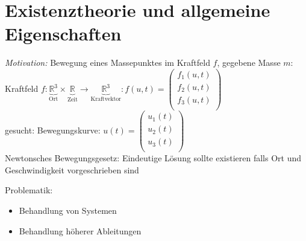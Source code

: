 \section{Existenztheorie und allgemeine Eigenschaften}
\emph{Motivation:}
Bewegung eines Massepunktes im Kraftfeld $f$,
gegebene Masse $m$:
Kraftfeld 
$f: \underbrace{\mathbb{R}^3}_{\text{Ort} }
\times \underbrace{\mathbb{R}}_{\text{Zeit} }
\rightarrow \underbrace{\mathbb{R}^3}_{\text{Kraftvektor}}:
f(u,t) = 
\begin{pmatrix}
    f_1(u,t) \\
    f_2(u,t) \\
    f_3(u,t) \\
\end{pmatrix}
$ \\
gesucht:
Bewegungskurve:
$u(t) = 
\begin{pmatrix}
    u_1(t) \\
    u_2(t) \\
    u_3(t) \\
\end{pmatrix}
$\\
Newtonsches Bewegungsgesetz:
Eindeutige Lösung sollte existieren falls Ort und Geschwindigkeit vorgeschrieben sind

Problematik:
\begin{itemize}
    \item Behandlung von Systemen
    \item Behandlung höherer Ableitungen
\end{itemize}